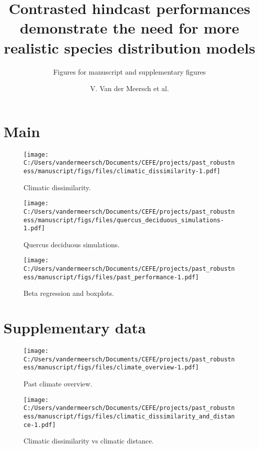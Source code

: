 \documentclass[
]{article}
\title{Contrasted hindcast performances demonstrate the need for more
realistic species distribution models}
\subtitle{Figures for manuscript and supplementary figures}
\author{V. Van der Meersch et al.}
\date{}
\begin{document}
\maketitle

\hypertarget{main}{%
\section{Main}\label{main}}

\begin{figure}
\centering
\texttt{[image: C:/Users/vandermeersch/Documents/CEFE/projects/past\_robustness/manuscript/figs/files/climatic\_dissimilarity-1.pdf]}
\caption{Climatic dissimilarity.}
\end{figure}

\newpage

\begin{figure}
\centering
\texttt{[image: C:/Users/vandermeersch/Documents/CEFE/projects/past\_robustness/manuscript/figs/files/quercus\_deciduous\_simulations-1.pdf]}
\caption{Quercus deciduous simulations.}
\end{figure}

\newpage

\begin{figure}
\centering
\texttt{[image: C:/Users/vandermeersch/Documents/CEFE/projects/past\_robustness/manuscript/figs/files/past\_performance-1.pdf]}
\caption{Beta regression and boxplots.}
\end{figure}

\newpage

\hypertarget{supplementary-data}{%
\section{Supplementary data}\label{supplementary-data}}

\renewcommand{\thefigure}{A.\arabic{figure}}
\setcounter{figure}{0}

\begin{figure}
\centering
\texttt{[image: C:/Users/vandermeersch/Documents/CEFE/projects/past\_robustness/manuscript/figs/files/climate\_overview-1.pdf]}
\caption{Past climate overview.}
\end{figure}

\begin{figure}
\centering
\texttt{[image: C:/Users/vandermeersch/Documents/CEFE/projects/past\_robustness/manuscript/figs/files/climatic\_dissimilarity\_and\_distance-1.pdf]}
\caption{Climatic dissimilarity vs climatic distance.}
\end{figure}
\end{document}
